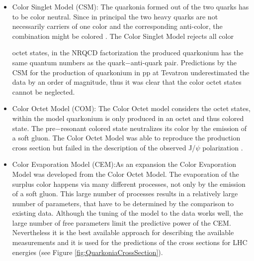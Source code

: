 \begin{itemize}
\item Color Singlet Model (CSM): The quarkonia formed out of the two quarks
has to be color neutral. Since in principal the two heavy quarks are not
necessarily carriers of one color and the corresponding anti-color, the
combination might be colored \footnotemark. The Color Singlet Model rejects all color


octet states, in the NRQCD factorization the produced quarkonium has
the same quantum numbers as the quark$-$anti-quark pair. Predictions by
the CSM for the production of quarkonium in pp at Tevatron underestimated
the data by an order of magnitude, thus it was clear that the
color octet states cannot be neglected.

\item Color Octet Model (COM): The Color Octet model considers the octet
states, within the model quarkonium is only produced in an octet and
thus colored state. The pre$-$resonant colored state neutralizes its color
by the emission of a soft gluon. The Color Octet Model was able to
reproduce the production cross section but failed in the description of
the observed J/$\psi$  polarization \cite{CDF_Pola}.

\item Color Evaporation Model (CEM):As an expansion the Color Evaporation
Model was developed from the Color Octet Model. The evaporation of
the surplus color happens via many different processes, not only by the
emission of a soft gluon. This large number of processes results in a
relatively large number of parameters, that have to be determined by the
comparison to existing data. Although the tuning of the model to the
data works well, the large number of free parameters limit the predictive
power of the CEM. Nevertheless it is the best available approach for
describing the available measurements and it is used for the predictions
of the cross sections for LHC energies (see Figure \ref{fig:QuarkoniaCrossSection}).
\end{itemize}

